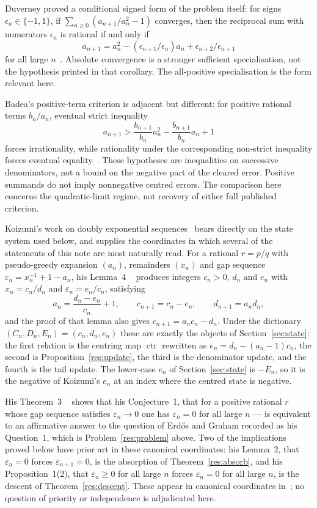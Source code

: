 \documentclass[11pt]{article}
\newcommand{\ctr}{\operatorname{ctr}}
\begin{document}
Duverney proved a
conditional signed form of the problem itself: for signs
$\epsilon_n\in\{-1,1\}$, if
$\sum_{n\ge0}(a_{n+1}/a_n^{2}-1)$ converges, then the reciprocal sum with
numerators $\epsilon_n$ is rational if and only if
\[
 a_{n+1}=a_n^2-(\epsilon_{n+1}/\epsilon_n)a_n
             +\epsilon_{n+2}/\epsilon_{n+1}
\]
for all large $n$~\cite[Corollary~3.2, p.~287]{duverney2001}.  Absolute
convergence is a stronger sufficient specialisation, not the hypothesis
printed in that corollary.  The all-positive specialisation is the form
relevant here.

Badea's positive-term criterion is adjacent but different:
for positive rational terms $b_n/a_n$, eventual strict inequality
\[
 a_{n+1}>\frac{b_{n+1}}{b_n}a_n^2-\frac{b_{n+1}}{b_n}a_n+1
\]
forces irrationality, while rationality under the corresponding non-strict
inequality forces eventual equality~\cite[Theorem~A, p.~313; Cor.~2.2,
p.~316]{badea1993}.  These hypotheses are inequalities on successive denominators, not a bound on
the negative part of the cleared error.  Positive summands do not imply
nonnegative centred errors.  The comparison here concerns the quadratic-limit
regime, not recovery of either full published criterion.

Koizumi's work on doubly exponential sequences~\cite{koizumi2025} bears
directly on the state system used below, and supplies the coordinates in which
several of the statements of this note are most naturally read.  For a rational
$r=p/q$ with pseudo-greedy expansion $(a_n)$, remainders $(x_n)$ and gap
sequence $\varepsilon_n=x_n^{-1}+1-a_n$, his Lemma~4
~\cite[p.~11]{koizumi2025} produces integers $c_n>0$,
$d_n$ and $e_n$ with $x_n=c_n/d_n$ and $\varepsilon_n=e_n/c_n$, satisfying
\[
 a_n=\frac{d_n-e_n}{c_n}+1,\qquad
 c_{n+1}=c_n-e_n,\qquad
 d_{n+1}=a_nd_n ,
\]
and the proof of that lemma also gives $c_{n+1}=a_nc_n-d_n$.  Under the
dictionary $(C_n,D_n,E_n)=(c_n,d_n,e_n)$ these are exactly the objects of
Section~\ref{sec:state}: the first relation is the centring map $\ctr$ rewritten
as $e_n=d_n-(a_n-1)c_n$, the second is Proposition~\ref{res:update}, the third
is the denominator update, and the fourth is the tail update.  The lower-case
$e_n$ of Section~\ref{sec:state} is $-E_n$, so it is the negative of Koizumi's
$e_n$ at an index where the centred state is negative.

His Theorem~3
~\cite[pp.~12--13]{koizumi2025} shows
that his Conjecture~1, that for a positive rational $r$ whose gap sequence
satisfies $\varepsilon_n\to0$ one has $\varepsilon_n=0$ for all large $n$ ---
is equivalent to an affirmative answer to the question of Erd\H{o}s and Graham
recorded as his Question~1, which is Problem~\ref{res:problem} above.
Two of the implications proved below have prior art in these canonical
coordinates: his Lemma~2, that $\varepsilon_n=0$ forces $\varepsilon_{n+1}=0$,
is the absorption of Theorem~\ref{res:absorb}, and his Proposition~1(2), that
$\varepsilon_n\ge0$ for all large $n$ forces $\varepsilon_n=0$ for all large
$n$, is the descent of Theorem~\ref{res:descent}.  These appear in canonical
coordinates in~\cite[Lemma~2, p.~10; Prop.~1(2), p.~14]{koizumi2025}; no
question of priority or independence is
adjudicated here.
\end{document}
